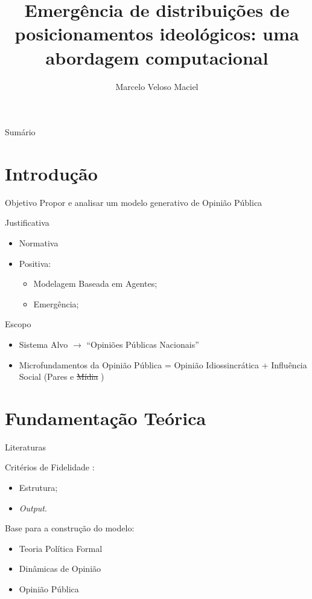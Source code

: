 \documentclass{beamer}
\title{Emergência de distribuições de posicionamentos ideológicos: uma abordagem
computacional}
\date{}
\author{Marcelo Veloso Maciel}
\institute{}
\begin{document}
\maketitle



\begin{frame}{Sumário}
\tableofcontents
\end{frame}



\section{Introdução}
\begin{frame}{Objetivo}
  Propor e analisar um modelo generativo de Opinião Pública
\end{frame}


\begin{frame}{Justificativa}
  \begin{itemize}
  \item Normativa
  \item Positiva: 
  \begin{itemize}
  \item Modelagem Baseada em Agentes;
    \item Emergência;
  \end{itemize}
  \end{itemize}
\end{frame}

\begin{frame}{Escopo}
  \begin{itemize}
  \item Sistema Alvo \(\rightarrow\) ``Opiniões Públicas Nacionais''
  \item Microfundamentos da Opinião Pública = Opinião Idiossincrática +
    Influência Social (Pares e \sout{Mídia} )
  \end{itemize}
  
\end{frame}

\section{Fundamentação Teórica}
\begin{frame}{Literaturas}

Critérios de Fidelidade \cite{weisberg2012simulation}:
\begin{itemize}
\item Estrutura;
\item \textit{Output}.
\end{itemize}
  
Base para a construção do modelo:

\begin{itemize}
\item Teoria Política Formal
\item Dinâmicas de Opinião
\item \textcolor{gray!70}{Opinião Pública}
\end{itemize}
\end{frame}
\end{document}
